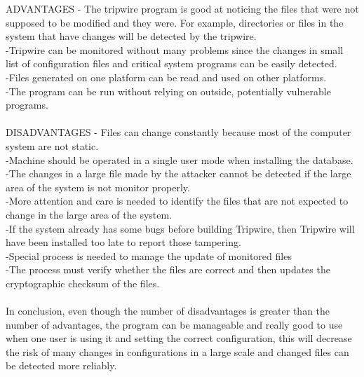 \documentclass[12pt]{article}
\begin{document}
\begin{enumerate}
	ADVANTAGES - The tripwire program is good at noticing the files that were not supposed to be modified and they were. For example, directories or files in the system that have changes will be detected by the tripwire. \\ -Tripwire can be monitored without many problems since the changes in small list of configuration files and critical system programs can be easily detected.  \\-Files generated on one platform can be read and used on other platforms. \\ -The program can be run without relying on outside, potentially vulnerable programs.\\\\ DISADVANTAGES - Files can change constantly because most of the computer system are not static.\\ -Machine should be operated in a single user mode when installing the database.\\-The changes in a large file made by the attacker cannot be detected if the large area of the system is not monitor properly.\\-More attention and care is needed to identify the files that are not expected to change in the large area of the system.\\-If the system already has some bugs before building Tripwire, then Tripwire will have been installed too late to report those tampering. \\-Special process is needed to manage the update of monitored files\\-The process must verify whether the files are correct and then updates the cryptographic checksum of the files. \\\\ In conclusion, even though the number of disadvantages is greater than the number of advantages, the program can be manageable and really good to use when one user is using it and setting the correct configuration, this will decrease the risk of many changes in configurations in a large scale and changed files can be detected more reliably. 
	
			
    
\end{enumerate}
\end{document}
